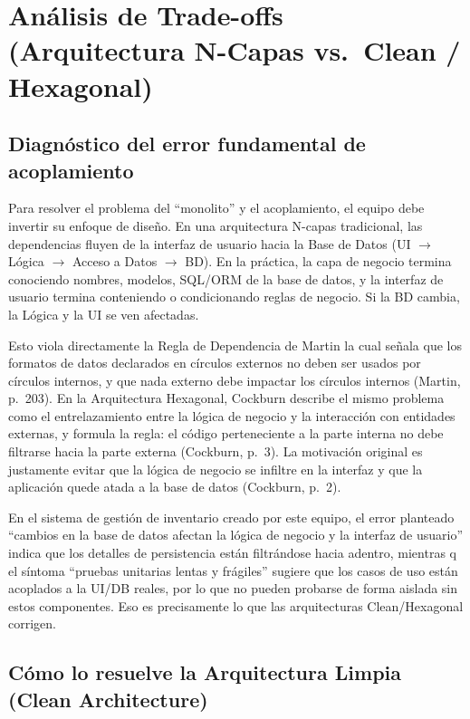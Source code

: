 \documentclass[12pt,a4paper]{article}
\begin{document}
\section{Análisis de Trade-offs (Arquitectura N-Capas vs.\ Clean / Hexagonal)}

\subsection{Diagnóstico del error fundamental de acoplamiento}

Para resolver el problema del ``monolito'' y el acoplamiento, el equipo debe invertir su enfoque de diseño. En una arquitectura N-capas tradicional, las dependencias fluyen de la interfaz de usuario hacia la Base de Datos (UI $\rightarrow$ Lógica $\rightarrow$ Acceso a Datos $\rightarrow$ BD). En la práctica, la capa de negocio termina conociendo nombres, modelos, SQL/ORM de la base de datos, y la interfaz de usuario termina conteniendo o condicionando reglas de negocio. Si la BD cambia, la Lógica y la UI se ven afectadas.

Esto viola directamente la Regla de Dependencia de Martin la cual señala que los formatos de datos declarados en círculos externos no deben ser usados por círculos internos, y que nada externo debe impactar los círculos internos (Martin, p.~203). En la Arquitectura Hexagonal, Cockburn describe el mismo problema como el entrelazamiento entre la lógica de negocio y la interacción con entidades externas, y formula la regla: el código perteneciente a la parte interna no debe filtrarse hacia la parte externa (Cockburn, p.~3). La motivación original es justamente evitar que la lógica de negocio se infiltre en la interfaz y que la aplicación quede atada a la base de datos (Cockburn, p.~2).

En el sistema de gestión de inventario creado por este equipo, el error planteado ``cambios en la base de datos afectan la lógica de negocio y la interfaz de usuario'' indica que los detalles de persistencia están filtrándose hacia adentro, mientras q el síntoma ``pruebas unitarias lentas y frágiles'' sugiere que los casos de uso están acoplados a la UI/DB reales, por lo que no pueden probarse de forma aislada sin estos componentes. Eso es precisamente lo que las arquitecturas Clean/Hexagonal corrigen.

\subsection{Cómo lo resuelve la Arquitectura Limpia (Clean Architecture)}
\end{document}
